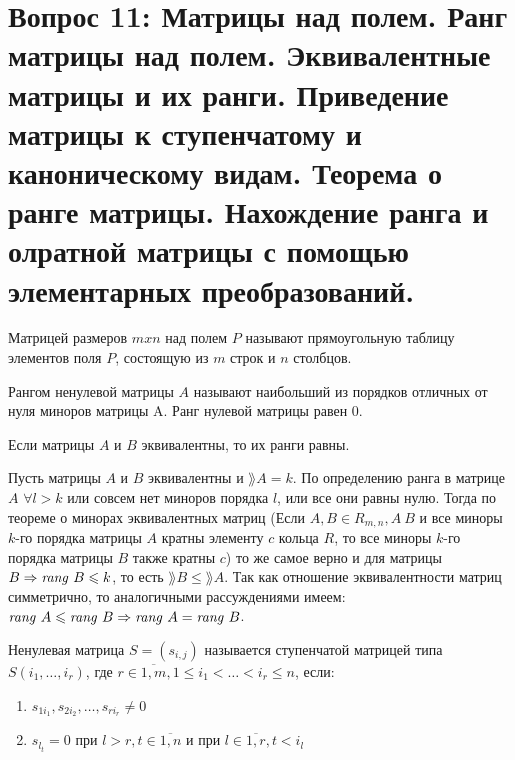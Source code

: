 \section{Вопрос 11: Матрицы над полем. Ранг матрицы над полем.
Эквивалентные матрицы и их ранги.
Приведение матрицы к ступенчатому и каноническому видам.
Теорема о ранге матрицы.
Нахождение ранга и олратной матрицы с помощью элементарных преобразований.}


\begin{defs}
  Матрицей размеров $mxn$ над полем $P$ называют прямоугольную таблицу
  элементов поля $P$, состоящую из $m$ строк и $n$ столбцов.
\end{defs}

\begin{defs}
  Рангом ненулевой матрицы  $A$ называют
  наибольший из порядков отличных от нуля миноров матрицы A.
  Ранг нулевой матрицы равен 0.
\end{defs}

\begin{proofs}
	Если матрицы $A$ и $B$ эквивалентны, то их ранги равны.
	\begin{dokvo}
    Пусть матрицы $A$ и $B$ эквивалентны и $\rang{A} = k$.
    По определению ранга в матрице $A$ $\forall l > k$ или совсем нет миноров порядка $l$, или все они равны нулю.
    Тогда по теореме о минорах эквивалентных матриц (Если $A,B \in R_{m,n}, A~B$ и все миноры $k$-го порядка матрицы $A$ кратны элементу $c$
    кольца $R$, то все миноры $k$-го порядка матрицы $B$ также кратны $c$) то же самое верно и для матрицы $B \Rightarrow \mathit{rang} \ B \leqslant k$, то есть $\rang{B} \leqslant \rang{A}$.
    Так как отношение эквивалентности матриц симметрично, то аналогичными рассуждениями имеем: $\mathit{rang} \ A \leqslant \mathit{rang} \ B \Rightarrow \mathit{rang} \ A = \mathit{rang} \ B$.
	\end{dokvo}
\end{proofs}

\begin{defs}
  Ненулевая матрица $S=(s_{i,j})$ называется ступенчатой матрицей типа $S(i_1, \ldots, i_r)$,
  где $r \in \overline{1,m}, 1 \leqslant i_1 < \ldots < i_r \leqslant n$, если:
  \begin{enumerate}
  	\item $s_{1i_1}, s_{2i_2}, \ldots, s_{ri_r} \neq 0$
  	\item $s_{l_t} = 0$ при $l > r, t \in \overline{1,n}$ и при $l \in \overline{1,r}, t < i_l$
  \end{enumerate}
\end{defs}

